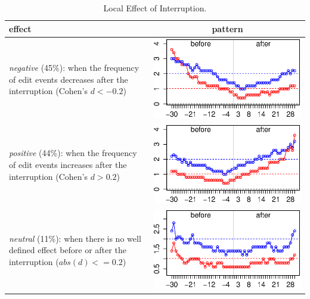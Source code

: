 \documentclass[conference]{IEEEtran}
\begin{document}
\begin{table}[ht!]
\caption{Local Effect of Interruption. }
\label{tbl:local_effect}
\centering
\begin{tabular}{p{4cm} | c}
effect & pattern \\
\hline
\textit{negative} (45\%): when the frequency of edit events decreases after the interruption (Cohen's $d < -0.2$)
	& \includegraphics[valign=m,scale=0.3]{figures/neg_ints} \\
\textit{positive} (44\%): when the frequency of edit events increases after the interruption (Cohen's $d > 0.2$)
	& \includegraphics[valign=m,scale=0.3]{figures/pos_ints} \\
\textit{neutral} (11\%): when there is no well defined effect before or after the interruption ($abs(d) <= 0.2$)
	& \includegraphics[valign=m,scale=0.3]{figures/neu_ints} 
\end{tabular}
\end{table}
\end{document}
